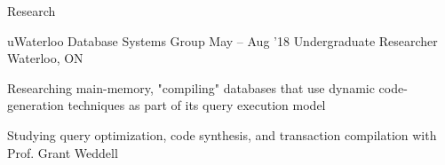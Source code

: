 \documentclass{resume} %
\begin{document}
\begin{rSection}{Research}
  \begin{rSubsection}{uWaterloo Database Systems Group}
	  {May -- Aug '18}
	  {Undergraduate Researcher}
	  {Waterloo, ON}
    \item Researching main-memory, "compiling" databases that use dynamic
      code-generation techniques as part of its query execution model
    \item Studying query optimization, code synthesis, and transaction
      compilation with Prof. Grant Weddell
  \end{rSubsection}
\end{rSection}
\end{document}
